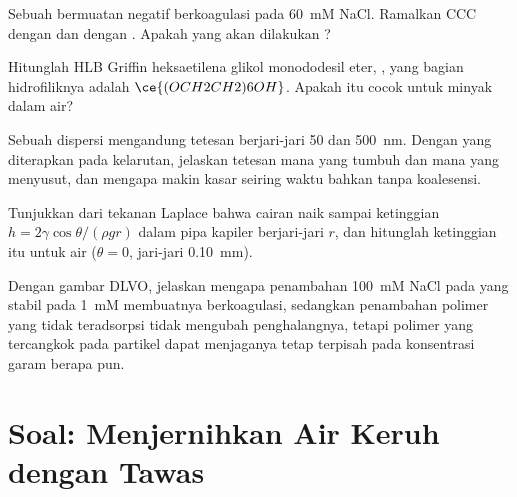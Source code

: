\begin{exercise}[$\star\star$]\label{exo:b3:colloids:8}
Sebuah  bermuatan negatif berkoagulasi pada \qty{60}{mM} NaCl. Ramalkan CCC dengan 
dan dengan . Apakah yang akan dilakukan ?
\end{exercise}

\begin{exercise}[$\star\star$]\label{exo:b3:colloids:9}
Hitunglah HLB Griffin heksaetilena glikol monododesil eter,
, yang bagian hidrofiliknya adalah $\ce{(OCH2CH2)6OH}$. Apakah  itu cocok untuk
 minyak dalam air?
\end{exercise}

\begin{exercise}[$\star\star\star$]\label{exo:b3:colloids:10}
Sebuah dispersi mengandung tetesan berjari-jari 50 dan \qty{500}{nm}. Dengan  yang diterapkan pada kelarutan, jelaskan tetesan mana yang tumbuh dan mana yang menyusut, dan mengapa
 makin kasar seiring waktu bahkan tanpa koalesensi.
\end{exercise}

\begin{exercise}[$\star\star\star$]\label{exo:b3:colloids:11}
Tunjukkan dari tekanan Laplace bahwa cairan naik sampai ketinggian $h = 2\gamma\cos\theta/(\rho gr)$ dalam
pipa kapiler berjari-jari $r$, dan hitunglah ketinggian itu untuk air ($\theta = 0$, jari-jari \qty{0.10}{mm}).
\end{exercise}

\begin{exercise}[$\star\star\star$]\label{exo:b3:colloids:12}
Dengan gambar DLVO, jelaskan mengapa penambahan \qty{100}{mM} NaCl pada  yang stabil pada \qty{1}{mM}
membuatnya berkoagulasi, sedangkan penambahan polimer yang tidak teradsorpsi tidak mengubah
penghalangnya, tetapi polimer yang tercangkok pada partikel dapat menjaganya tetap terpisah pada
konsentrasi garam berapa pun.
\end{exercise}

\clearpage
\enlargethispage{3\baselineskip}
\section{Soal: Menjernihkan Air Keruh dengan Tawas}

